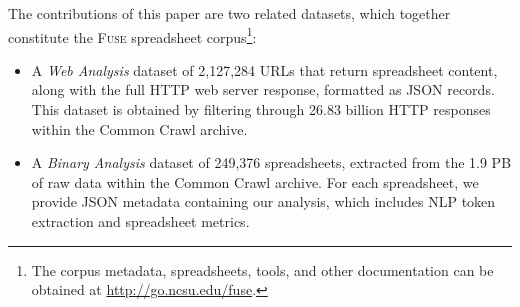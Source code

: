 \documentclass[conference]{IEEEtran}
\newcommand{\urlcount}{2,127,284}
\newcommand{\xlscount}{249,376}
\begin{document}





The contributions of this paper are two related datasets, which together constitute the \textsc{Fuse} spreadsheet corpus\footnote{The corpus metadata, spreadsheets, tools, and other documentation can be obtained at \url{http://go.ncsu.edu/fuse}.}:

\begin{itemize}
\item A \emph{Web Analysis} dataset of \urlcount{} URLs that return spreadsheet content, along with the full HTTP web server response, formatted as JSON records. This dataset is obtained by filtering through 26.83 billion HTTP responses within the Common Crawl archive.
\item A \emph{Binary Analysis} dataset of \xlscount{} spreadsheets, extracted from the 1.9 PB of raw data within the Common Crawl archive. For each spreadsheet, we provide JSON metadata containing our analysis, which includes NLP token extraction and spreadsheet metrics.
\end{itemize}
\end{document}
